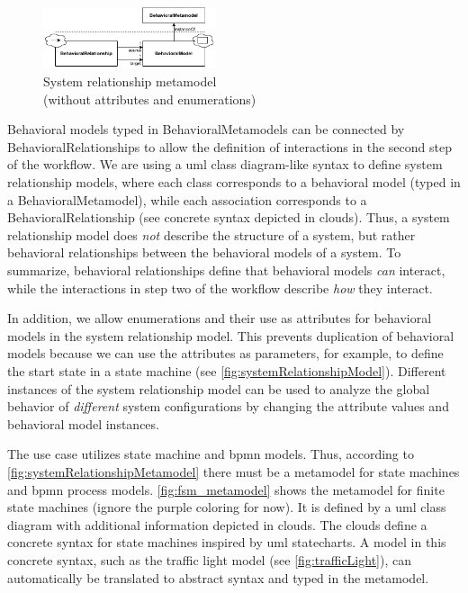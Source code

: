 \documentclass{jot}
\begin{document}
\begin{figure}[h]
    \centering
    \includegraphics[width=0.45\textwidth]{figures/systemRelationshipMetamodel.pdf}
    \caption{System relationship metamodel \\ (without attributes and enumerations)}
    \label{fig:systemRelationshipMetamodel}
\end{figure}

Behavioral models typed in \textsf{BehavioralMetamodel}s can be connected by \textsf{BehavioralRelationship}s to allow the definition of interactions in the second step of the workflow.
We are using a \gls*{uml} class diagram-like syntax to define system relationship models, where each class corresponds to a behavioral model (typed in a \textsf{BehavioralMetamodel}), while each association corresponds to a \textsf{BehavioralRelationship} (see concrete syntax depicted in clouds).
Thus, a system relationship model does \emph{not} describe the structure of a system, but rather behavioral relationships between the behavioral models of a system.
To summarize, behavioral relationships define that behavioral models \textit{can} interact, while the interactions in step two of the workflow describe \textit{how} they interact.

In addition, we allow enumerations and their use as attributes for behavioral models in the system relationship model.
This prevents duplication of behavioral models because we can use the attributes as parameters, for example, to define the start state in a state machine (see \autoref{fig:systemRelationshipModel}).
Different instances of the system relationship model can be used to analyze the global behavior of \emph{different} system configurations by changing the attribute values and behavioral model instances.

The use case utilizes state machine and \gls*{bpmn} models.
Thus, according to \autoref{fig:systemRelationshipMetamodel} there must be a metamodel for state machines and \gls*{bpmn} process models.
\autoref{fig:fsm_metamodel} shows the metamodel for finite state machines (ignore the purple coloring for now).
It is defined by a \gls*{uml} class diagram with additional information depicted in clouds.
The clouds define a concrete syntax for state machines inspired by \gls*{uml} statecharts.
A model in this concrete syntax, such as the traffic light model (see \autoref{fig:trafficLight}), can automatically be translated to abstract syntax and typed in the metamodel.
\end{document}
